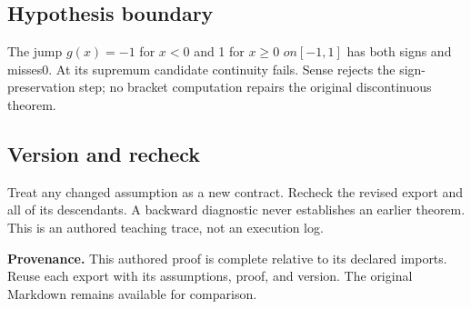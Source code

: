 \documentclass[preprint,12pt,aps,pra,showkeys,amsmath,amssymb,superscriptaddress,floatfix]{revtex4-2}
\theoremstyle{definition}
\theoremstyle{remark}
\begin{document}
\subsection{Hypothesis boundary}
The jump \(g(x)=-1\) for \(x<0\) and 1 for \(x\ge 0\) \(on[-1,1]\) has
both signs and misses0. At its supremum candidate continuity fails.
Sense rejects the sign-preservation step; no bracket computation repairs
the original discontinuous theorem.

\subsection{Version and recheck}
Treat any changed assumption as a new contract. Recheck the revised
export and all of its descendants. A backward diagnostic never
establishes an earlier theorem. This is an authored teaching trace, not
an execution log.

\par\medskip\begingroup\small\linespread{1.0}\selectfont\noindent\textbf{Provenance.} This authored proof is complete relative to its declared imports. Reuse
each export with its assumptions, proof, and version. The original
Markdown remains available for comparison.
\par\endgroup
\end{document}
